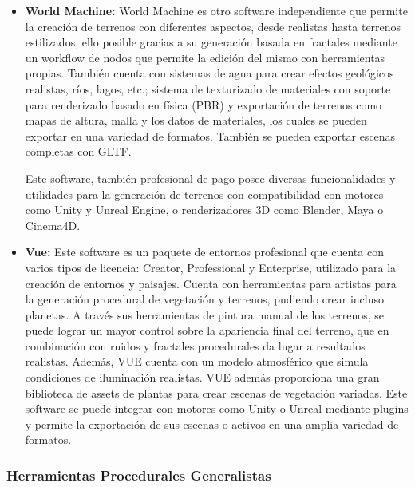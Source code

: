 \begin{itemize}[label=\textbullet]
                \item \textbf{World Machine:}
                World Machine es otro software independiente que permite la creación de terrenos con diferentes aspectos, desde realistas hasta terrenos estilizados, ello posible gracias a su generación basada en fractales mediante un workflow de nodos que permite la edición del mismo con herramientas propias. También cuenta con sistemas de agua para crear efectos geológicos realistas, ríos, lagos, etc.; sistema de texturizado de materiales con soporte para renderizado basado en física (PBR) y exportación de terrenos como mapas de altura, malla y los datos de materiales, los cuales se pueden exportar en una variedad de formatos. También se pueden exportar escenas completas con GLTF.

                Este software, también profesional de pago posee diversas funcionalidades y utilidades para la generación de terrenos  con compatibilidad con motores como Unity y Unreal Engine, o renderizadores 3D como Blender, Maya o Cinema4D. \cite{world-machine}

                \item \textbf{Vue:}
                Este software es un paquete de entornos profesional que cuenta con varios tipos de licencia: Creator, Professional y Enterprise, utilizado para la creación de entornos y paisajes. Cuenta con herramientas para artistas para la generación procedural de vegetación y terrenos, pudiendo crear incluso planetas. A través sus herramientas de pintura manual de los terrenos, se puede lograr un mayor control sobre la apariencia final del terreno, que en combinación con ruidos y fractales procedurales da lugar a resultados realistas. Además, VUE cuenta con un modelo atmosférico que simula condiciones de iluminación realistas. VUE además proporciona una gran biblioteca de assets de plantas para crear escenas de vegetación variadas. Este software se puede integrar con motores como Unity o Unreal mediante plugins y permite la exportación de sus escenas o activos en una amplia variedad de formatos. \cite{VUEOverview} 
            \end{itemize}

        \subsubsection{Herramientas Procedurales Generalistas}

